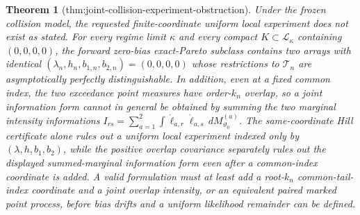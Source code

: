 \documentclass{article}
\newtheorem{theorem}{Theorem}
\begin{document}
\begin{theorem}[thm:joint-collision-experiment-obstruction]\label{thm:joint-collision-experiment-obstruction}
Under the frozen collision model, the requested finite-coordinate uniform local experiment does not exist as stated.  For every regime limit \(\kappa\) and every compact \(K\subset\mathcal L_\kappa\) containing \((0,0,0,0)\), the forward zero-bias exact-Pareto subclass contains two arrays with identical \((\lambda_n,h_n,b_{1,n},b_{2,n})=(0,0,0,0)\) whose restrictions to \(\mathcal T_n\) are asymptotically perfectly distinguishable.  In addition, even at a fixed common index, the two exceedance point measures have order-\(k_n\) overlap, so a joint information form cannot in general be obtained by summing the two marginal intensity informations \(I_{rs}=\sum_{a=1}^2\int\dot\ell_{a,r}\dot\ell_{a,s}\,dM_{\vartheta_0}^{(a)}\).  The same-coordinate Hill certificate alone rules out a uniform local experiment indexed only by \((\lambda,h,b_1,b_2)\), while the positive overlap covariance separately rules out the displayed summed-marginal information form even after a common-index coordinate is added.  A valid formulation must at least add a root-\(k_n\) common-tail-index coordinate and a joint overlap intensity, or an equivalent paired marked point process, before bias drifts and a uniform likelihood remainder can be defined.
\end{theorem}
\end{document}
